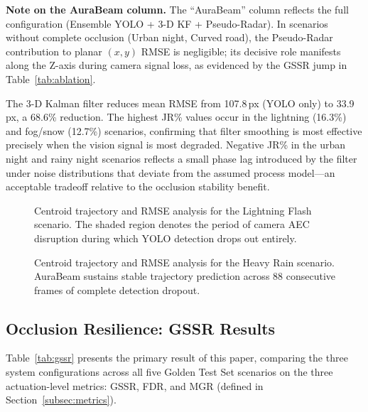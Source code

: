 \documentclass{jstarticle}
\theoremstyle{remark}
\begin{document}
\noindent\textbf{Note on the AuraBeam column.} The ``AuraBeam'' column
reflects the full configuration (Ensemble YOLO + 3-D KF +
Pseudo-Radar). In scenarios without complete occlusion (Urban night,
Curved road), the Pseudo-Radar contribution to planar $(x,y)$ RMSE
is negligible; its decisive role manifests along the Z-axis during
camera signal loss, as evidenced by the GSSR jump in
Table~\ref{tab:ablation}.

The 3-D Kalman filter reduces mean RMSE from 107.8\,px (YOLO only)
to 33.9\,px, a 68.6\% reduction. The highest JR\% values occur in the
lightning (16.3\%) and fog/snow (12.7\%) scenarios, confirming that
filter smoothing is most effective precisely when the vision signal is
most degraded. Negative JR\% in the urban night and rainy night
scenarios reflects a small phase lag introduced by the filter under
noise distributions that deviate from the assumed process model---an
acceptable tradeoff relative to the occlusion stability benefit.

\begin{figure}[H]
    \centering
    \caption{Centroid trajectory and RMSE analysis for the Lightning
             Flash scenario. The shaded region denotes the period of
             camera AEC disruption during which YOLO detection drops
             out entirely.}
    \label{fig:traj_lightning}
\end{figure}

\begin{figure}[H]
    \centering
    \caption{Centroid trajectory and RMSE analysis for the Heavy Rain
             scenario. AuraBeam sustains stable trajectory prediction
             across 88 consecutive frames of complete detection dropout.}
    \label{fig:traj_rain}
\end{figure}

\subsection{Occlusion Resilience: GSSR Results}
\label{subsec:res_gssr}

Table~\ref{tab:gssr} presents the primary result of this paper,
comparing the three system configurations across all five Golden Test
Set scenarios on the three actuation-level metrics: GSSR, FDR, and
MGR (defined in Section~\ref{subsec:metrics}).
\end{document}
